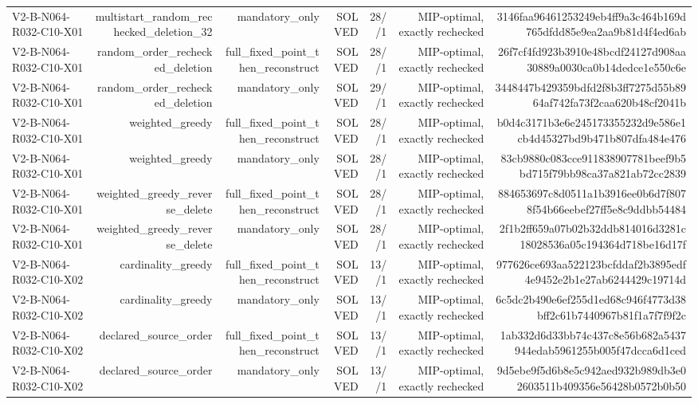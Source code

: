 {\begin{longtable}{lrrrrrr}
V2-B-N064-R032-C10-X01 & multistart\_random\_rechecked\_deletion\_32 & mandatory\_only & SOLVED & 28//1 & MIP-optimal, exactly rechecked & 3146faa96461253249eb4ff9a3c464b169d765dfdd85e9ea2aa9b81d4f4ed6ab \\
V2-B-N064-R032-C10-X01 & random\_order\_rechecked\_deletion & full\_fixed\_point\_then\_reconstruct & SOLVED & 28//1 & MIP-optimal, exactly rechecked & 26f7cf4fd923b3910e48bcdf24127d908aa30889a0030ca0b14dedce1e550c6e \\
V2-B-N064-R032-C10-X01 & random\_order\_rechecked\_deletion & mandatory\_only & SOLVED & 29//1 & MIP-optimal, exactly rechecked & 3448447b429359bdfd2f8b3ff7275d55b8964af742fa73f2caa620b48cf2041b \\
V2-B-N064-R032-C10-X01 & weighted\_greedy & full\_fixed\_point\_then\_reconstruct & SOLVED & 28//1 & MIP-optimal, exactly rechecked & b0d4c3171b3e6e245173355232d9e586e1cb4d45327bd9b471b807dfa484e476 \\
V2-B-N064-R032-C10-X01 & weighted\_greedy & mandatory\_only & SOLVED & 28//1 & MIP-optimal, exactly rechecked & 83cb9880c083cce911838907781beef9b5bd715f79bb98ca37a821ab72cc2839 \\
V2-B-N064-R032-C10-X01 & weighted\_greedy\_reverse\_delete & full\_fixed\_point\_then\_reconstruct & SOLVED & 28//1 & MIP-optimal, exactly rechecked & 884653697c8d0511a1b3916ee0b6d7f8078f54b66eebef27ff5e8c9ddbb54484 \\
V2-B-N064-R032-C10-X01 & weighted\_greedy\_reverse\_delete & mandatory\_only & SOLVED & 28//1 & MIP-optimal, exactly rechecked & 2f1b2ff659a07b02b32ddb814016d3281c18028536a05c194364d718be16d17f \\
V2-B-N064-R032-C10-X02 & cardinality\_greedy & full\_fixed\_point\_then\_reconstruct & SOLVED & 13//1 & MIP-optimal, exactly rechecked & 977626ce693aa522123bcfddaf2b3895edf4e9452e2b1e27ab6244429c19714d \\
V2-B-N064-R032-C10-X02 & cardinality\_greedy & mandatory\_only & SOLVED & 13//1 & MIP-optimal, exactly rechecked & 6c5dc2b490e6ef255d1ed68c946f4773d38bff2c61b7440967b81f1a7f7f9f2c \\
V2-B-N064-R032-C10-X02 & declared\_source\_order & full\_fixed\_point\_then\_reconstruct & SOLVED & 13//1 & MIP-optimal, exactly rechecked & 1ab332d6d33bb74c437c8e56b682a5437944edab5961255b005f47dcca6d1ced \\
V2-B-N064-R032-C10-X02 & declared\_source\_order & mandatory\_only & SOLVED & 13//1 & MIP-optimal, exactly rechecked & 9d5ebe9f5d6b8e5c942aed932b989db3e02603511b409356e56428b0572b0b50 \\

\end{longtable}}
